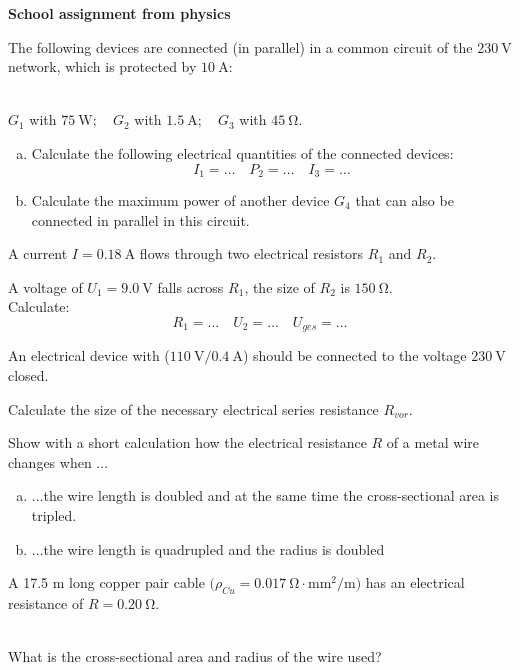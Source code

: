 \documentclass[a4paper]{article}
\begin{document}
	{\bf School assignment from physics }\\
	\begin{enumerate}[1.]
		
		{\bf \item The following devices are connected (in parallel) in a common circuit of the $\SI{230}{\volt}$ network, which is protected by $\SI{10}{\ampere}$:} \\
		$G_1$ with $ \SI{75}{\watt};\quad G_2$ with $\SI{1.5}{\ampere}; \quad G_3 $ with $\SI{45}{\ohm}$.
		
		\begin{enumerate}[a)]
			\item Calculate the following electrical quantities of the connected devices:
			$$ I_1=\dots \quad P_2=\dots \quad I_3=\dots$$
			\item Calculate the maximum power of another device $G_4$ that can also be connected in parallel in this circuit.
		\end{enumerate}
		
		{\bf \item A current $I = \SI{0.18}{\ampere}$ flows through two electrical resistors $R_1$ and $R_2$.} A voltage of $U_1=\SI{9,0}{\volt}$ falls across $R_1$, the size of $R_2$ is
		$\SI{150}{\ohm}$.\\
		Calculate:
		$$R_1=\dots \quad U_2=\dots \quad U_{ges}=\dots $$
		
		{\bf \item An electrical device with ($\SI{110}{\volt} / \SI{0.4}{\ampere} $) should be connected to the voltage $\SI{230}{\volt}$ \-closed.} Calculate the size of the necessary electrical series resistance $R_{vor}$.
		
		{\bf \item Show with a short calculation how the electrical resistance $R$ of a metal wire changes when $\dots$}
		\begin{enumerate}[a)]
			\item $\dots$the wire length is doubled and at the same time the cross-sectional area is tripled.
			\item $\dots$the wire length is quadrupled and the radius is doubled
		\end{enumerate}
		
		{\bf \item A 17.5 m long copper pair cable
			$\bigl( \rho_{Cu}= \SI{0.017}{\ohm\cdot\milli\meter^2 \per \meter}\bigr)$
			has an electrical resistance of $R=\SI{0.20}{\ohm}$.}\\
		What is the cross-sectional area and radius of the wire used?
		

\end{enumerate}
\end{document}
